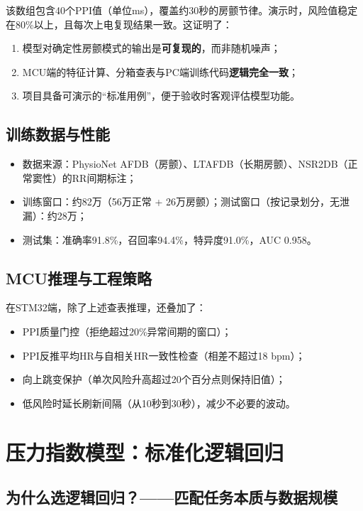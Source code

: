 \documentclass[UTF8]{ctexart}
\begin{document}
该数组包含40个PPI值（单位ms），覆盖约30秒的房颤节律。演示时，风险值稳定在80\%以上，且每次上电复现结果一致。这证明了：
\begin{enumerate}
    \item 模型对确定性房颤模式的输出是\textbf{可复现的}，而非随机噪声；
    \item MCU端的特征计算、分箱查表与PC端训练代码\textbf{逻辑完全一致}；
    \item 项目具备可演示的“标准用例”，便于验收时客观评估模型功能。
\end{enumerate}

\subsection{训练数据与性能}
\begin{itemize}
    \item 数据来源：PhysioNet AFDB（房颤）、LTAFDB（长期房颤）、NSR2DB（正常窦性）的RR间期标注；
    \item 训练窗口：约82万（56万正常 + 26万房颤）；测试窗口（按记录划分，无泄漏）：约28万；
    \item 测试集：准确率91.8\%，召回率94.4\%，特异度91.0\%，AUC 0.958。
\end{itemize}

\subsection{MCU推理与工程策略}
在STM32端，除了上述查表推理，还叠加了：
\begin{itemize}
    \item PPI质量门控（拒绝超过20\%异常间期的窗口）；
    \item PPI反推平均HR与自相关HR一致性检查（相差不超过18 bpm）；
    \item 向上跳变保护（单次风险升高超过20个百分点则保持旧值）；
    \item 低风险时延长刷新间隔（从10秒到30秒），减少不必要的波动。
\end{itemize}

\section{压力指数模型：标准化逻辑回归}

\subsection{为什么选逻辑回归？——匹配任务本质与数据规模}
\end{document}

